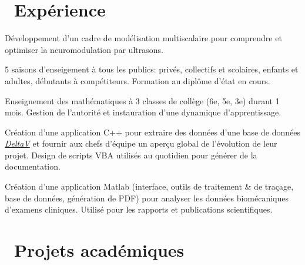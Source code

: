 \documentclass[a4paper]{cv}
\begin{document}
\begin{minipage}[t]{0.6\textwidth}

\section{\texorpdfstring{\faBriefcase}\ \ Expérience}\sectionline

Développement d'un cadre de modélisation multiscalaire pour comprendre et optimiser la neuromodulation par ultrasons.
\sectionspace

5 saisons d'enseigement à tous les publics: privés, collectifs et scolaires, enfants et adultes, débutants à compétiteurs. Formation au diplôme d’état en cours.
\sectionspace

Enseignement des mathématiques à 3 classes de collège (6e, 5e, 3e) durant 1 mois. Gestion de l'autorité et instauration d'une dynamique d'apprentissage.
\sectionspace

Création d'une application C++ pour extraire des données d'une base de données \href{http://www3.emersonprocess.com/deltav/version13/}{\emph{DeltaV}} et fournir aux chefs d’équipe un aperçu global de l'évolution de leur projet. Design de scripts VBA utilisés au quotidien pour générer de la documentation.\sectionspace

Création d'une application Matlab (interface, outils de traitement \& de traçage, base de données, génération de PDF) pour analyser les données biomécaniques d’examens cliniques. Utilisé pour les rapports et publications scientifiques.
\sectionspace

\section{\texorpdfstring{\faLineChart} \ \ Projets académiques}\sectionline


\end{minipage}
\end{document}
